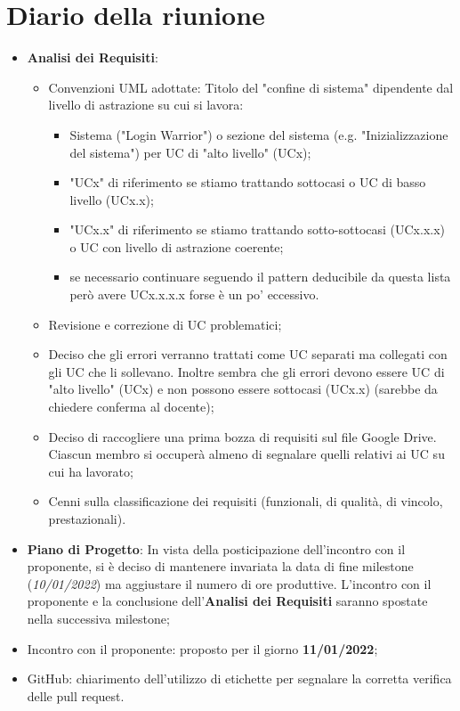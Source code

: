 \section{Diario della riunione}
\begin{itemize}
  \item \textbf{Analisi dei Requisiti}: 
  \begin{itemize}
    \item Convenzioni UML adottate: Titolo del "confine di sistema" dipendente dal livello di astrazione su cui si lavora:
    \begin{itemize}
      \item Sistema ("Login Warrior") o sezione del sistema (e.g. "Inizializzazione del sistema") per UC di "alto livello" (UCx);
      \item "UCx" di riferimento se stiamo trattando sottocasi o UC di basso livello (UCx.x);
      \item "UCx.x" di riferimento se stiamo trattando sotto-sottocasi (UCx.x.x) o UC con livello di astrazione coerente;
      \item se necessario continuare seguendo il pattern deducibile da questa lista però avere UCx.x.x.x forse è un po' eccessivo. 
    \end{itemize}
    \item Revisione e correzione di UC problematici;
    \item Deciso che gli errori verranno trattati come UC separati ma collegati con gli UC che li sollevano. Inoltre sembra che gli errori devono essere UC di "alto livello" (UCx) e non possono essere sottocasi (UCx.x) (sarebbe da chiedere conferma al docente);
    \item Deciso di raccogliere una prima bozza di requisiti sul file Google Drive. Ciascun membro si occuperà almeno di segnalare quelli relativi ai UC su cui ha lavorato;
    \item Cenni sulla classificazione dei requisiti (funzionali, di qualità, di vincolo, prestazionali).
  \end{itemize}
  \item \textbf{Piano di Progetto}: In vista della posticipazione dell'incontro con il proponente, si è deciso di mantenere invariata la data di fine milestone (\textit{10/01/2022}) ma aggiustare il numero di ore produttive. L'incontro con il proponente e la conclusione dell'\textbf{Analisi dei Requisiti} saranno spostate nella successiva milestone;
  \item Incontro con il proponente: proposto per il giorno \textbf{11/01/2022};
  \item GitHub: chiarimento dell'utilizzo di etichette per segnalare la corretta verifica delle pull request.  
\end{itemize}
